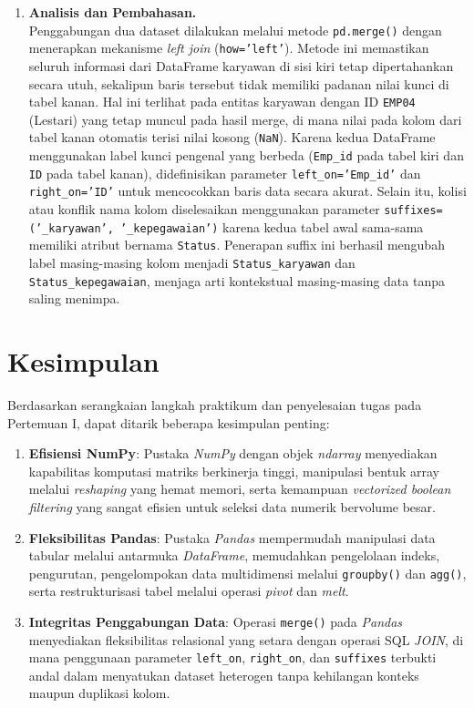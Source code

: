 \documentclass[a4paper,oneside,12pt]{report}
\begin{document}
\begin{enumerate}
\begin{enumerate}
        \item[4.] \textbf{Analisis dan Pembahasan.} \\
        Penggabungan dua dataset dilakukan melalui metode \texttt{pd.merge()} dengan menerapkan mekanisme \textit{left join} (\texttt{how='left'}). Metode ini memastikan seluruh informasi dari DataFrame karyawan di sisi kiri tetap dipertahankan secara utuh, sekalipun baris tersebut tidak memiliki padanan nilai kunci di tabel kanan. Hal ini terlihat pada entitas karyawan dengan ID \texttt{EMP04} (Lestari) yang tetap muncul pada hasil merge, di mana nilai pada kolom dari tabel kanan otomatis terisi nilai kosong (\texttt{NaN}). Karena kedua DataFrame menggunakan label kunci pengenal yang berbeda (\texttt{Emp\_id} pada tabel kiri dan \texttt{ID} pada tabel kanan), didefinisikan parameter \texttt{left\_on='Emp\_id'} dan \texttt{right\_on='ID'} untuk mencocokkan baris data secara akurat. Selain itu, kolisi atau konflik nama kolom diselesaikan menggunakan parameter \texttt{suffixes=('\_karyawan', '\_kepegawaian')} karena kedua tabel awal sama-sama memiliki atribut bernama \texttt{Status}. Penerapan suffix ini berhasil mengubah label masing-masing kolom menjadi \texttt{Status\_karyawan} dan \texttt{Status\_kepegawaian}, menjaga arti kontekstual masing-masing data tanpa saling menimpa.
    \end{enumerate}
\end{enumerate}
\clearpage

\chapter{Kesimpulan}
Berdasarkan serangkaian langkah praktikum dan penyelesaian tugas pada Pertemuan I, dapat ditarik beberapa kesimpulan penting:
\begin{enumerate}
    \item \textbf{Efisiensi NumPy}: Pustaka \textit{NumPy} dengan objek \textit{ndarray} menyediakan kapabilitas komputasi matriks berkinerja tinggi, manipulasi bentuk array melalui \textit{reshaping} yang hemat memori, serta kemampuan \textit{vectorized boolean filtering} yang sangat efisien untuk seleksi data numerik bervolume besar.
    \item \textbf{Fleksibilitas Pandas}: Pustaka \textit{Pandas} mempermudah manipulasi data tabular melalui antarmuka \textit{DataFrame}, memudahkan pengelolaan indeks, pengurutan, pengelompokan data multidimensi melalui \texttt{groupby()} dan \texttt{agg()}, serta restrukturisasi tabel melalui operasi \textit{pivot} dan \textit{melt}.
    \item \textbf{Integritas Penggabungan Data}: Operasi \texttt{merge()} pada \textit{Pandas} menyediakan fleksibilitas relasional yang setara dengan operasi SQL \textit{JOIN}, di mana penggunaan parameter \texttt{left\_on}, \texttt{right\_on}, dan \texttt{suffixes} terbukti andal dalam menyatukan dataset heterogen tanpa kehilangan konteks maupun duplikasi kolom.
\end{enumerate}
\clearpage
\end{document}
